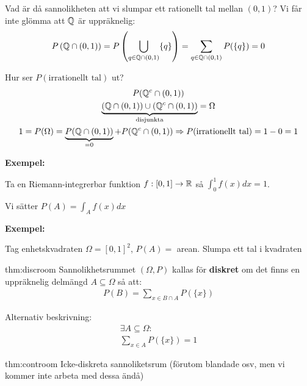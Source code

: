 \par\bigskip
\noindent Vad är då sannolikheten att vi slumpar ett rationellt tal mellan $(0,1)$? Vi får inte glömma att $\mathbb{Q}$ är uppräknelig:
\begin{equation*}
  \begin{gathered}
    P\left(\mathbb{Q}\cap(0,1)\right) = P\left(\bigcup_{q\in\mathbb{Q}\cap(0,1)}\{q\}\right) = \sum_{q\in\mathbb{Q}\cap(0,1)}P(\{q\}) = 0
  \end{gathered}
\end{equation*}
\par\bigskip
\noindent Hur ser $P(\text{irrationellt tal})$ ut?
\begin{equation*}
  \begin{gathered}
    P(\mathbb{Q}^c\cap(0,1))\\
    \underbrace{(\mathbb{Q}\cap(0,1))\cup(\mathbb{Q}^c\cap(0,1))}_{\text{disjunkta}}=\Omega\\
    1 = P(\Omega) = \underbrace{P(\mathbb{Q}\cap(0,1))}_{\text{=0}}+P(\mathbb{Q}^c\cap(0,1))\Rightarrow P(\text{irrationellt tal}) = 1-0=1
  \end{gathered}
\end{equation*}
\par\bigskip
\noindent\textbf{Exempel:}
\par\bigskip
\noindent Ta en Riemann-integrerbar funktion $f:[0,1]\to\mathbb{R}$ så $\int_{0}^{1}f(x)dx=1$.
\par\bigskip
\noindent Vi sätter $P(A) = \int_{A}f(x)dx$
\par\bigskip
\noindent\textbf{Exempel:}
\par\bigskip
\noindent Tag enhetskvadraten $\Omega = [0,1]^2$, $P(A) =$ arean. Slumpa ett tal i kvadraten
\newpage
\begin{theo}{thm:discroom}
  Sannolikhetsrummet $(\Omega, P)$ kallas för \textbf{diskret} om det finns en uppräknelig delmängd $A\subseteq\Omega$ så att:
  \begin{equation*}
    \begin{gathered}
      P(B) = \sum_{x\in B\cap A}P(\{x\})
    \end{gathered}
  \end{equation*}
  \par\bigskip
  \noindent Alternativ beskrivning:
  \begin{equation*}
    \begin{gathered}
      \exists A\subseteq\Omega:\\
      \sum_{x\in A}P(\{x\}) = 1
    \end{gathered}
  \end{equation*}
\end{theo}
\par\bigskip
\begin{theo}{thm:controom}
  Icke-diskreta sannoliketsrum (förutom blandade osv, men vi kommer inte arbeta med dessa ändå)
\end{theo}
\par\bigskip

